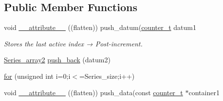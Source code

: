 \subsection*{Public Member Functions}
\begin{DoxyCompactItemize}
\item 
void \hyperlink{classLin__CrossCorr__RT__Teensy_a33f639fa3a6f025d5a9ebe60b969cc55}{\+\_\+\+\_\+attribute\+\_\+\+\_\+} ((flatten)) push\+\_\+datum(\hyperlink{types_8hpp_a22f279793847eba127de149437848c48}{counter\+\_\+t} datum1
\begin{DoxyCompactList}\small\item\em Stores the last active index → Post-\/increment. \end{DoxyCompactList}\item 
\hyperlink{classLin__CrossCorr__RT__Teensy_a509bcfdab5a3239a014f5805c388172a}{Series\+\_\+array2} \hyperlink{classLin__CrossCorr__RT__Teensy_af39e68107a612ca22a83046b10f52afb}{push\+\_\+back} (datum2)
\item 
\hyperlink{classLin__CrossCorr__RT__Teensy_aca7ed016d12272211206139cd120b359}{for} (unsigned int i=0;i$<$=Series\+\_\+size;i++)
\item 
void \hyperlink{classLin__CrossCorr__RT__Teensy_a1d3a4042f89c99d3705f50666fa7735c}{\+\_\+\+\_\+attribute\+\_\+\+\_\+} ((flatten)) push\+\_\+data(const \hyperlink{types_8hpp_a22f279793847eba127de149437848c48}{counter\+\_\+t} $\ast$container1
\end{DoxyCompactItemize}
